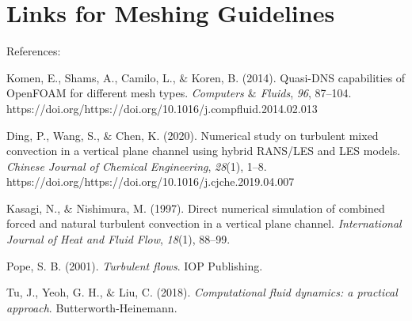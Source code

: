 \documentclass[12pt]{article}
\renewcommand{\_}{\kern-1.5pt\textunderscore\kern-1.5pt}
\begin{document}
\tableofcontents

\part*{Links for Meshing Guidelines}
References:\par

\begin{adjustwidth}{0.33in}{0.0in}
Komen, E., Shams, A., Camilo, L., $\&$  Koren, B. (2014). Quasi-DNS capabilities of OpenFOAM for different mesh types. \textit{Computers $\&$  Fluids}, \textit{96}, 87–104. https://doi.org/https://doi.org/10.1016/j.compfluid.2014.02.013\par

\end{adjustwidth}

\begin{adjustwidth}{0.33in}{0.0in}
Ding, P., Wang, S., $\&$  Chen, K. (2020). Numerical study on turbulent mixed convection in a vertical plane channel using hybrid RANS/LES and LES models. \textit{Chinese Journal of Chemical Engineering}, \textit{28}(1), 1–8. https://doi.org/https://doi.org/10.1016/j.cjche.2019.04.007\par

\end{adjustwidth}

\begin{adjustwidth}{0.33in}{0.0in}
Kasagi, N., $\&$  Nishimura, M. (1997). Direct numerical simulation of combined forced and natural turbulent convection in a vertical plane channel. \textit{International Journal of Heat and Fluid Flow}, \textit{18}(1), 88–99.\par

\end{adjustwidth}

\begin{adjustwidth}{0.33in}{0.0in}
Pope, S. B. (2001). \textit{Turbulent flows}. IOP Publishing.\par

\end{adjustwidth}

\begin{adjustwidth}{0.33in}{0.0in}
Tu, J., Yeoh, G. H., $\&$  Liu, C. (2018). \textit{Computational fluid dynamics: a practical approach}. Butterworth-Heinemann.\par

\end{adjustwidth}
\end{document}
